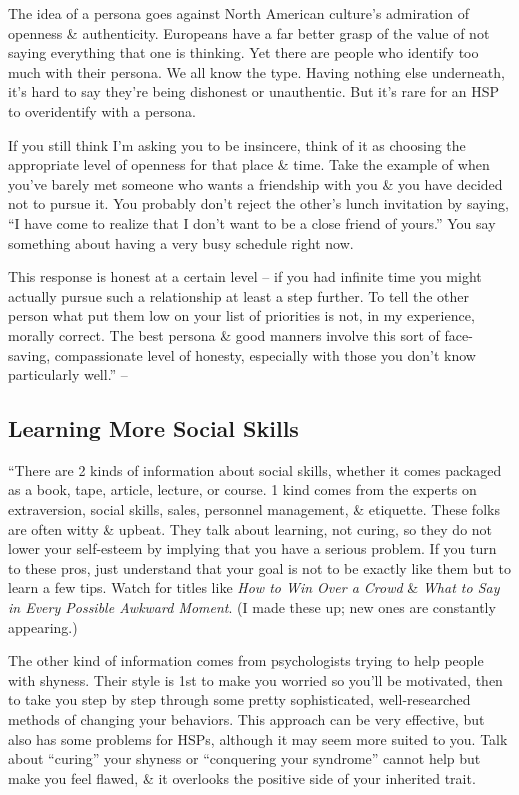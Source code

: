 \documentclass{article}
\numberwithin{equation}{section}
\begin{document}
The idea of a persona goes against North American culture's admiration of openness \& authenticity. Europeans have a far better grasp of the value of not saying everything that one is thinking. Yet there are people who identify too much with their persona. We all know the type. Having nothing else underneath, it's hard to say they're being dishonest or unauthentic. But it's rare for an HSP to overidentify with a persona.

If you still think I'm asking you to be insincere, think of it as choosing the appropriate level of openness for that place \& time. Take the example of when you've barely met someone who wants a friendship with you \& you have decided not to pursue it. You probably don't reject the other's lunch invitation by saying, ``I have come to realize that I don't want to be a close friend of yours.'' You say something about having a very busy schedule right now.

This response is honest at a certain level -- if you had infinite time you might actually pursue such a relationship at least a step further. To tell the other person what put them low on your list of priorities is not, in my experience, morally correct. The best persona \& good manners involve this sort of face-saving, compassionate level of honesty, especially with those you don't know particularly well.'' -- \cite[pp. 133--135]{Aron2013}

\subsection{Learning More Social Skills}
``There are 2 kinds of information about social skills, whether it comes packaged as a book, tape, article, lecture, or course. 1 kind comes from the experts on extraversion, social skills, sales, personnel management, \& etiquette. These folks are often witty \& upbeat. They talk about learning, not curing, so they do not lower your self-esteem by implying that you have a serious problem. If you turn to these pros, just understand that your goal is not to be exactly like them but to learn a few tips. Watch for titles like \textit{How to Win Over a Crowd} \& \textit{What to Say in Every Possible Awkward Moment}. (I made these up; new ones are constantly appearing.)

The other kind of information comes from psychologists trying to help people with shyness. Their style is 1st to make you worried so you'll be motivated, then to take you step by step through some pretty sophisticated, well-researched methods of changing your behaviors. This approach can be very effective, but also has some problems for HSPs, although it may seem more suited to you. Talk about ``curing'' your shyness or ``conquering your syndrome'' cannot help but make you feel flawed, \& it overlooks the positive side of your inherited trait.
\end{document}
